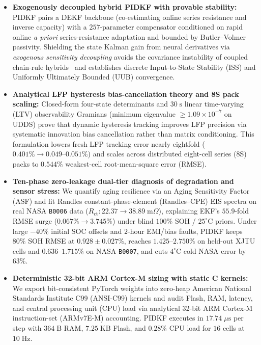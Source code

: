 \documentclass[10pt,a4paper]{article}
\providecommand{\upmu}{\mu}
\begin{document}
\begin{itemize}
\item \textbf{Exogenously decoupled hybrid PIDKF with provable stability:} PIDKF pairs a DEKF backbone (co-estimating online series resistance and inverse capacity) with a $257$-parameter compensator conditioned on rapid online \emph{a priori} series-resistance adaptation and bounded by Butler--Volmer passivity. Shielding the state Kalman gain from neural derivatives via \emph{exogenous sensitivity decoupling} avoids the covariance instability of coupled chain-rule hybrids~\cite{Charkhgard2010dekf,Wang2024aekf_lstm,Yu2025lstm_ekf} and establishes discrete Input-to-State Stability (ISS) and Uniformly Ultimately Bounded (UUB) convergence.
\item \textbf{Analytical LFP hysteresis bias-cancellation theory and 8S pack scaling:} Closed-form four-state determinants and $30\;\mathrm{s}$ linear time-varying (LTV) observability Gramians (minimum eigenvalue $\ge 1.09\times 10^{-7}$ on UDDS) prove that dynamic hysteresis tracking improves LFP precision via systematic innovation bias cancellation rather than matrix conditioning. This formulation lowers fresh LFP tracking error nearly eightfold ($0.401\% \rightarrow 0.049\text{--}0.051\%$) and scales across distributed eight-cell series (8S) packs to $0.544\%$ weakest-cell root-mean-square error (RMSE).
\item \textbf{Ten-phase zero-leakage dual-tier diagnosis of degradation and sensor stress:} We quantify aging resilience via an Aging Sensitivity Factor (ASF) and fit Randles constant-phase-element (Randles--CPE) EIS spectra on real NASA \texttt{B0006} data ($R_{\text{ct}}: 22.37 \rightarrow 38.89\;\mathrm{m}\Omega$), explaining EKF's $55.9$-fold RMSE surge ($0.067\% \rightarrow 3.745\%$) under blind $100\%$ SOH / $25^\circ\text{C}$ priors. Under large $-40\%$ initial SOC offsets and $2$-hour EMI/bias faults, PIDKF keeps $80\%$ SOH RMSE at $0.928\pm0.027\%$, reaches $1.425\text{--}2.750\%$ on held-out XJTU cells and $0.636\text{--}1.715\%$ on NASA \texttt{B0007}, and cuts $4^\circ\text{C}$ cold NASA error by $63\%$.
\item \textbf{Deterministic 32-bit ARM Cortex-M sizing with static C kernels:} We export bit-consistent PyTorch weights into zero-heap American National Standards Institute C99 (ANSI-C99) kernels and audit Flash, RAM, latency, and central processing unit (CPU) load via analytical 32-bit ARM Cortex-M instruction-set (ARMv7E-M) accounting. PIDKF executes in $17.74\;\upmu\mathrm{s}$ per step with $364\;\mathrm{B}$ RAM, $7.25\;\mathrm{KB}$ Flash, and $0.28\%$ CPU load for $16$ cells at $10\;\mathrm{Hz}$.
\end{itemize}
\end{document}
